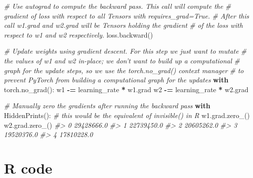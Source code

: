 \documentclass[]{book}
\newenvironment{Shaded}{\begin{snugshade}}{\end{snugshade}}
\newcommand{\CommentTok}[1]{\textcolor[rgb]{0.56,0.35,0.01}{\textit{#1}}}
\newcommand{\ControlFlowTok}[1]{\textcolor[rgb]{0.13,0.29,0.53}{\textbf{#1}}}
\newcommand{\NormalTok}[1]{#1}
\newcommand{\OperatorTok}[1]{\textcolor[rgb]{0.81,0.36,0.00}{\textbf{#1}}}
\begin{document}
\begin{Shaded}
\begin{Highlighting}[]
  \CommentTok{# Use autograd to compute the backward pass. This call will compute the}
  \CommentTok{# gradient of loss with respect to all Tensors with requires_grad=True.}
  \CommentTok{# After this call w1.grad and w2.grad will be Tensors holding the gradient}
  \CommentTok{# of the loss with respect to w1 and w2 respectively.}
\NormalTok{  loss.backward()}

  \CommentTok{# Update weights using gradient descent. For this step we just want to mutate}
  \CommentTok{# the values of w1 and w2 in-place; we don't want to build up a computational}
  \CommentTok{# graph for the update steps, so we use the torch.no_grad() context manager}
  \CommentTok{# to prevent PyTorch from building a computational graph for the updates}
  \ControlFlowTok{with}\NormalTok{ torch.no_grad():}
\NormalTok{    w1 }\OperatorTok{-=}\NormalTok{ learning_rate }\OperatorTok{*}\NormalTok{ w1.grad}
\NormalTok{    w2 }\OperatorTok{-=}\NormalTok{ learning_rate }\OperatorTok{*}\NormalTok{ w2.grad}

    \CommentTok{# Manually zero the gradients after running the backward pass}
    \ControlFlowTok{with}\NormalTok{ HiddenPrints():   }\CommentTok{# this would be the equivalent of invisible() in R}
\NormalTok{      w1.grad.zero_()}
\NormalTok{      w2.grad.zero_()}
\CommentTok{#> 0 29428666.0}
\CommentTok{#> 1 22739450.0}
\CommentTok{#> 2 20605262.0}
\CommentTok{#> 3 19520376.0}
\CommentTok{#> 4 17810228.0}
\end{Highlighting}
\end{Shaded}

\hypertarget{r-code}{%
\section{R code}\label{r-code}}
\end{document}
